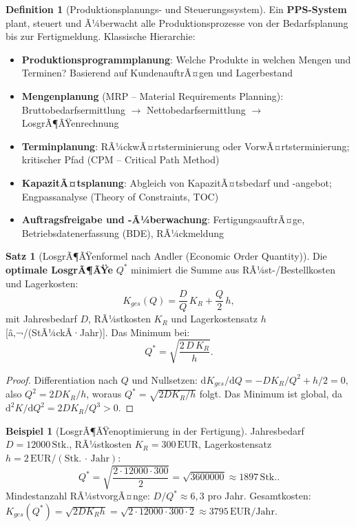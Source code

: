 ﻿\documentclass[a4paper,12pt]{report}
\theoremstyle{definition}
\newtheorem{definition}{Definition}
\newtheorem{beispiel}{Beispiel}
\newtheorem{satz}{Satz}
\begin{document}
\begin{definition}[Produktionsplanungs- und Steuerungssystem]
Ein \textbf{PPS-System} plant, steuert und Ã¼berwacht alle Produktionsprozesse
von der Bedarfsplanung bis zur Fertigmeldung. Klassische Hierarchie:
\begin{itemize}
    \item[-] \textbf{Produktionsprogrammplanung}: Welche Produkte in welchen Mengen
          und Terminen? Basierend auf KundenauftrÃ¤gen und Lagerbestand
    \item[-] \textbf{Mengenplanung} (MRP -- Material Requirements Planning):
          Bruttobedarfsermittlung $\to$ Nettobedarfsermittlung $\to$ LosgrÃ¶ÃŸenrechnung
    \item[-] \textbf{Terminplanung}: RÃ¼ckwÃ¤rtsterminierung oder VorwÃ¤rtsterminierung;
          kritischer Pfad (CPM -- Critical Path Method)
    \item[-] \textbf{KapazitÃ¤tsplanung}: Abgleich von KapazitÃ¤tsbedarf und
          -angebot; Engpassanalyse (Theory of Constraints, TOC)
    \item[-] \textbf{Auftragsfreigabe und -Ã¼berwachung}: FertigungsauftrÃ¤ge,
          Betriebsdatenerfassung (BDE), RÃ¼ckmeldung
\end{itemize}
\end{definition}

\begin{satz}[LosgrÃ¶ÃŸenformel nach Andler (Economic Order Quantity)]
Die \textbf{optimale LosgrÃ¶ÃŸe} $Q^*$ minimiert die Summe aus RÃ¼st-/Bestellkosten
und Lagerkosten:
\[
  K_{ges}(Q) = \frac{D}{Q}\,K_R + \frac{Q}{2}\,h,
\]
mit Jahresbedarf $D$, RÃ¼stkosten $K_R$ und Lagerkostensatz $h$ [â‚¬/(StÃ¼ckÂ·Jahr)].
Das Minimum bei:
\[
  Q^* = \sqrt{\frac{2\,D\,K_R}{h}}.
\]
\end{satz}
\begin{proof}
Differentiation nach $Q$ und Nullsetzen:
$\mathrm{d}K_{ges}/\mathrm{d}Q = -DK_R/Q^2 + h/2 = 0$,
also $Q^2 = 2DK_R/h$, woraus $Q^* = \sqrt{2DK_R/h}$ folgt.
Das Minimum ist global, da $\mathrm{d}^2K/\mathrm{d}Q^2 = 2DK_R/Q^3 > 0$.
\end{proof}

\begin{beispiel}[LosgrÃ¶ÃŸenoptimierung in der Fertigung]
Jahresbedarf $D = 12000\,\mathrm{Stk.}$, RÃ¼stkosten $K_R = 300\,\mathrm{EUR}$,
Lagerkostensatz $h = 2\,\mathrm{EUR/(Stk.\,\cdot\,Jahr)}$:
\[
  Q^* = \sqrt{\frac{2\cdot12000\cdot300}{2}} = \sqrt{3600000} \approx 1897\,\mathrm{Stk.}.
\]
Mindestanzahl RÃ¼stvorgÃ¤nge: $D/Q^* \approx 6{,}3$ pro Jahr.
Gesamtkosten: $K_{ges}(Q^*) = \sqrt{2DK_Rh} = \sqrt{2\cdot12000\cdot300\cdot2}
\approx 3795\,\mathrm{EUR/Jahr}$.
\end{beispiel}
\end{document}

